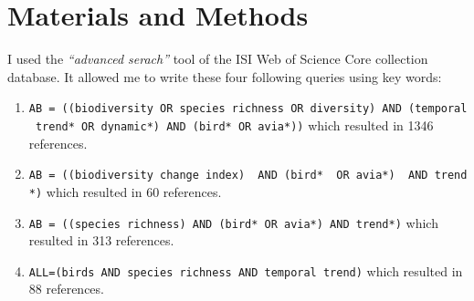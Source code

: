 \documentclass[
  12pt,
  oneside]{report}
\begin{document}
\hypertarget{materials-and-methods}{%
\chapter{Materials and Methods}\label{materials-and-methods}}

I used the \emph{\enquote{advanced serach}} tool of the ISI Web of Science Core collection database. It allowed me to write these four following queries using key words:

\begin{enumerate}
\def\labelenumi{\arabic{enumi}.}
\item
  \texttt{AB\ =\ ((biodiversity\ OR\ species\ richness\ OR\ diversity)\ AND\ (temporal\ trend*\ OR\ dynamic*)\ AND\ (bird*\ OR\ avia*))} which resulted in 1346 references.
\item
  \texttt{AB\ =\ ((biodiversity\ change\ index)\ \ AND\ (bird*\ \ OR\ avia*)\ \ AND\ trend*)} which resulted in 60 references.
\item
  \texttt{AB\ =\ ((species\ richness)\ AND\ (bird*\ OR\ avia*)\ AND\ trend*)} which resulted in 313 references.
\item
  \texttt{ALL=(birds\ AND\ species\ richness\ AND\ temporal\ trend)} which resulted in 88 references.
\end{enumerate}
\end{document}
